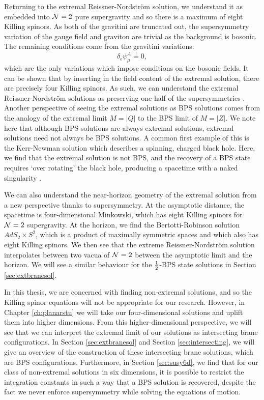 Returning to the extremal Reissner-Nordstr\"om solution, we understand it as embedded into ${\cal N} = 2$ pure supergravity and so there is a maximum of eight Killing spinors. As both of the gravitini are truncated out, the supersymmetry variation of the gauge field and graviton are trivial as the background is bosonic. The remaining conditions come from the gravitini variations: 
\begin{equation*}
	\delta_\epsilon \psi^A_\mu \stackrel{!}{=} 0,
\end{equation*}
which are the only variations which impose conditions on the bosonic fields. It can be shown that by inserting in the field content of the extremal solution, there are precisely four Killing spinors. As such, we can understand the extremal Reissner-Nordstr\"om solutions as preserving one-half of the supersymmetries \cite{Mohaupt:2000mj}. Another perspective of seeing the extremal solutions as BPS solutions comes from the analogy of the extremal limit $M = |Q|$ to the BPS limit of $M = |Z|$. We note here that although BPS solutions are always extremal solutions, extremal solutions need not always be BPS solutions. A common first example of this is the Kerr-Newman solution which describes a spinning, charged black hole. Here, we find that the extremal solution is not BPS, and the recovery of a BPS state requires `over rotating' the black hole, producing a spacetime with a naked singularity \cite{Tod:1983pm}.

We can also understand the near-horizon geometry of the extremal solution from a new perspective thanks to supersymmetry. At the asymptotic distance, the spacetime is four-dimensional Minkowski, which has eight Killing spinors for ${\cal N} = 2$ supergravity. At the horizon, we find the Bertotti-Robinson solution $AdS_2 \times S^2$, which is a product of maximally symmetric spaces and which also has eight Killing spinors. We then see that the extreme Reissner-Nordstr\"om solution interpolates between two vacua of ${\cal N} = 2$ between the asymptotic limit and the horizon. We will see a similar behaviour for the $\frac{1}{2}$-BPS state solutions in Section \ref{sec:extbranesol}.

In this thesis, we are concerned with finding non-extremal solutions, and so the Killing spinor equations will not be appropriate for our research. However, in Chapter \ref{ch:planarstu} we will take our four-dimensional solutions and uplift them into higher dimensions. From this higher-dimensional perspective, we will see that we can interpret the extremal limit of our solutions as intersecting brane configurations. In Section \ref{sec:extbranesol} and Section \ref{sec:intersecting}, we will give an overview of the construction of these intersecting brane solutions, which are BPS configurations. Furthermore, in Section \ref{sec:susy6d}, we find that for our class of non-extremal solutions in six dimensions, it is possible to restrict the integration constants in such a way that a BPS solution is recovered, despite the fact we never enforce supersymmetry while solving the equations of motion. 

